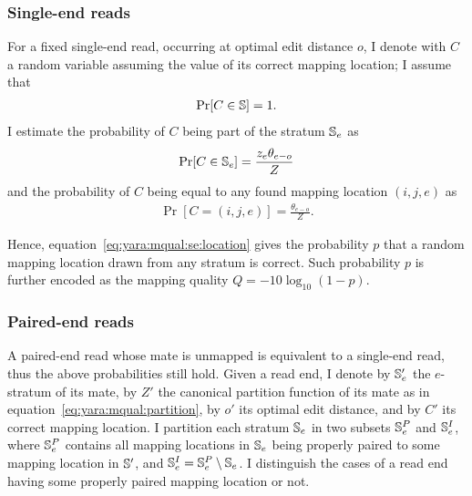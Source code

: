 \subsubsection{Single-end reads}

For a fixed single-end read, occurring at optimal edit distance $o$, I denote with $C$ a random variable assuming the value of its correct mapping location; I assume that
\begin{eqnarray}
\Pr[C \in \mathbb{S}] = 1.
\end{eqnarray}
I estimate the probability of $C$ being part of the stratum $\mathbb{S}_e$ as
\begin{eqnarray}
\label{eq:yara:mqual:se:stratum}
\Pr[C \in \mathbb{S}_e] = \frac{z_e \theta_{e-o}}{Z}
\end{eqnarray}
and the probability of $C$ being equal to any found mapping location $(i,j,e)$ as
\begin{eqnarray}
\label{eq:yara:mqual:se:location}
\Pr[C = (i,j,e)] = \frac{\theta_{e-o}}{Z}.
\end{eqnarray}


Hence, equation~\ref{eq:yara:mqual:se:location} gives the probability $p$ that a random mapping location drawn from any stratum is correct.
Such probability $p$ is further encoded as the mapping quality $Q=-10 \log_{10}(1-p)$.

\subsubsection{Paired-end reads}

A paired-end read whose mate is unmapped is equivalent to a single-end read, thus the above probabilities still hold.
Given a read end, I denote by $\mathbb{S}'_e$ the $e$-stratum of its mate, by $Z'$ the canonical partition function of its mate as in equation~\ref{eq:yara:mqual:partition}, by $o'$ its optimal edit distance, and by $C'$ its correct mapping location.
I partition each stratum $\mathbb{S}_e$ in two subsets $\mathbb{S}^P_e$ and $\mathbb{S}^I_e$, where $\mathbb{S}^P_e$ contains all mapping locations in $\mathbb{S}_e$ being properly paired to some mapping location in $\mathbb{S}'$, and $\mathbb{S}^I_e = \mathbb{S}^P_e \setminus \mathbb{S}_e$.
I distinguish the cases of a read end having some properly paired mapping location or not.

